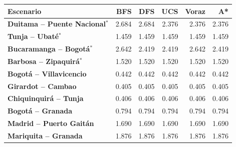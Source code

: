 \renewcommand{\arraystretch}{1.2}
\begin{tabular}{|l|r|r|r|r|r|}
\hline
\rowcolor{gray!20} \textbf{Escenario} & \textbf{BFS} & \textbf{DFS} & \textbf{UCS} & \textbf{Voraz} & \textbf{A*} \\
\hline
\textbf{Duitama -- Puente Nacional$^{*}$} & 2.684 & 2.684 & 2.376 & 2.376 & 2.376 \\
\hline
\textbf{Tunja -- Ubaté$^{*}$} & 1.459 & 1.459 & 1.459 & 1.459 & 1.459 \\
\hline
\textbf{Bucaramanga -- Bogotá$^{*}$} & 2.642 & 2.419 & 2.419 & 2.642 & 2.419 \\
\hline
\textbf{Barbosa -- Zipaquirá$^{*}$} & 1.520 & 1.520 & 1.520 & 1.520 & 1.520 \\
\hline
\textbf{Bogotá -- Villavicencio} & 0.442 & 0.442 & 0.442 & 0.442 & 0.442 \\
\hline
\textbf{Girardot -- Cambao} & 0.405 & 0.405 & 0.405 & 0.405 & 0.405 \\
\hline
\textbf{Chiquinquirá -- Tunja} & 0.406 & 0.406 & 0.406 & 0.406 & 0.406 \\
\hline
\textbf{Bogotá -- Granada} & 0.794 & 0.794 & 0.794 & 0.794 & 0.794 \\
\hline
\textbf{Madrid -- Puerto Gaitán} & 1.690 & 1.690 & 1.690 & 1.690 & 1.690 \\
\hline
\textbf{Mariquita -- Granada} & 1.876 & 1.876 & 1.876 & 1.876 & 1.876 \\
\hline
\end{tabular}
